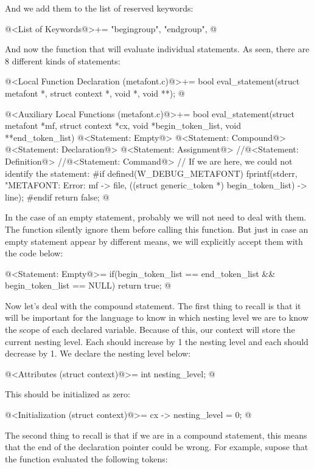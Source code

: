 And we add them to the list of reserved keywords:

\iniciocodigo
@<List of Keywords@>+=
"begingroup", "endgroup",
@
\fimcodigo

And now the function that will evaluate individual statements. As
seen, there are 8 different kinds of statements:

\iniciocodigo
@<Local Function Declaration (metafont.c)@>+=
bool eval_statement(struct metafont *, struct context *, void *, void **);
@
\fimcodigo


\iniciocodigo
@<Auxiliary Local Functions (metafont.c)@>+=
bool eval_statement(struct metafont *mf, struct context *cx,
                     void *begin_token_list, void **end_token_list){
  @<Statement: Empty@>
  @<Statement: Compound@>
  @<Statement: Declaration@>
  @<Statement: Assignment@>
  //@<Statement: Definition@>
  //@<Statement: Command@>
  // If we are here, we could not identify the statement:
#if defined(W_DEBUG_METAFONT)
    fprintf(stderr, "METAFONT: Error: %
            mf -> file,
            ((struct generic_token *) begin_token_list) -> line);
#endif
  return false;
}
@
\fimcodigo

In the case of an empty statement, probably we will not need to deal
with them. The function 
silently ignore them before calling this function. But just in case an
empty statement appear by different means, we will explicitly accept
them with the code below:

\iniciocodigo
@<Statement: Empty@>=
if(begin_token_list == end_token_list && begin_token_list == NULL)
  return true;
@
\fimcodigo

Now let's deal with the compound statement. The first thing to recall
is that it will be important for the language to know in which nesting
level we are to know the scope of each declared variable. Because of
this, our context will store the current nesting
level. Each  should increase by 1 the nesting
level and each  should decrease by 1. We declare
the nesting level below:

\iniciocodigo
@<Attributes (struct context)@>=
  int nesting_level;
@
\fimcodigo

This should be initialized as zero:

\iniciocodigo
@<Initialization (struct context)@>=
  cx -> nesting_level = 0;
@
\fimcodigo


The second thing to recall is that if we are in a compound statement,
this means that the end of the declaration pointer could be wrong.
For example, supose that the
function  evaluated the
following tokens:

